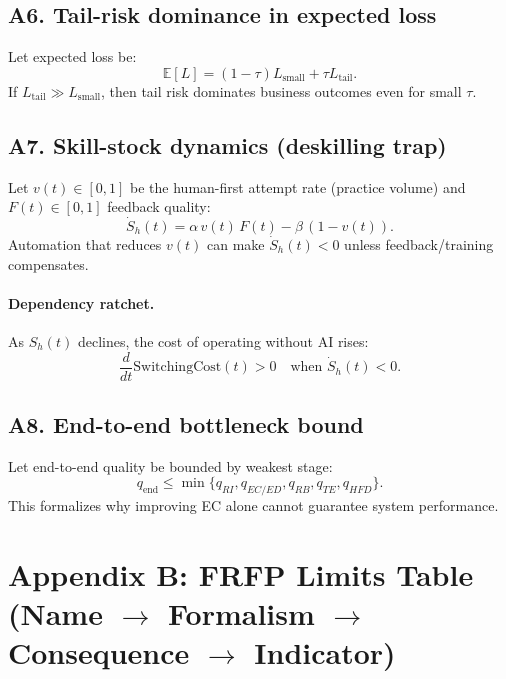 \subsection*{A6. Tail-risk dominance in expected loss}
Let expected loss be:
\begin{equation}
\mathbb{E}[L]= (1-\tau)L_{\text{small}}+\tau L_{\text{tail}}.
\end{equation}
If $L_{\text{tail}}\gg L_{\text{small}}$, then tail risk dominates business outcomes even for small $\tau$.

\subsection*{A7. Skill-stock dynamics (deskilling trap)}
Let $v(t)\in[0,1]$ be the human-first attempt rate (practice volume) and $F(t)\in[0,1]$ feedback quality:
\begin{equation}
\dot S_h(t)=\alpha\,v(t)\,F(t)-\beta\,(1-v(t)).
\end{equation}
Automation that reduces $v(t)$ can make $\dot S_h(t)<0$ unless feedback/training compensates.

\paragraph{Dependency ratchet.}
As $S_h(t)$ declines, the cost of operating without AI rises:
\begin{equation}
\frac{d}{dt}\text{SwitchingCost}(t) > 0 \quad \text{when } \dot S_h(t) < 0.
\end{equation}

\subsection*{A8. End-to-end bottleneck bound}
Let end-to-end quality be bounded by weakest stage:
\begin{equation}
q_{\text{end}} \le \min\{q_{RI}, q_{EC/ED}, q_{RB}, q_{TE}, q_{HFD}\}.
\end{equation}
This formalizes why improving EC alone cannot guarantee system performance.

\newpage
\section*{Appendix B: FRFP Limits Table (Name $\rightarrow$ Formalism $\rightarrow$ Consequence $\rightarrow$ Indicator)}

